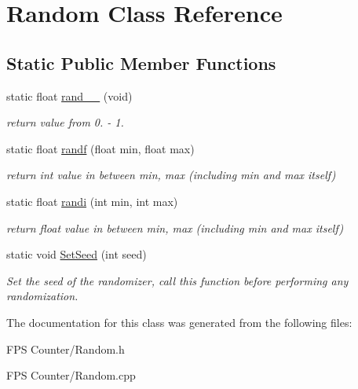 \hypertarget{class_random}{}\section{Random Class Reference}
\label{class_random}
\subsection*{Static Public Member Functions}
\begin{DoxyCompactItemize}
\item 
\mbox{\label{class_random_ac281663a3c59056bda0b2242735c2d6f}} 
static float \mbox{\hyperlink{class_random_ac281663a3c59056bda0b2242735c2d6f}{rand\+\_\+\_}} (void)
\begin{DoxyCompactList}\small\item\em return value from 0. -\/ 1. \end{DoxyCompactList}\item 
\mbox{\label{class_random_ac12473be88fe8388e54b892c2994b652}} 
static float \mbox{\hyperlink{class_random_ac12473be88fe8388e54b892c2994b652}{randf}} (float min, float max)
\begin{DoxyCompactList}\small\item\em return int value in between min, max (including min and max itself) \end{DoxyCompactList}\item 
\mbox{\label{class_random_a73a1fc971dc0e46eae612e0b02924b63}} 
static float \mbox{\hyperlink{class_random_a73a1fc971dc0e46eae612e0b02924b63}{randi}} (int min, int max)
\begin{DoxyCompactList}\small\item\em return float value in between min, max (including min and max itself) \end{DoxyCompactList}\item 
\mbox{\label{class_random_aea2f96bdfb95f2aabba9a94c0f9b40f1}} 
static void \mbox{\hyperlink{class_random_aea2f96bdfb95f2aabba9a94c0f9b40f1}{Set\+Seed}} (int seed)
\begin{DoxyCompactList}\small\item\em Set the seed of the randomizer, call this function before performing any randomization. \end{DoxyCompactList}\end{DoxyCompactItemize}


The documentation for this class was generated from the following files\+:\begin{DoxyCompactItemize}
\item 
F\+P\+S Counter/Random.\+h\item 
F\+P\+S Counter/Random.\+cpp\end{DoxyCompactItemize}
